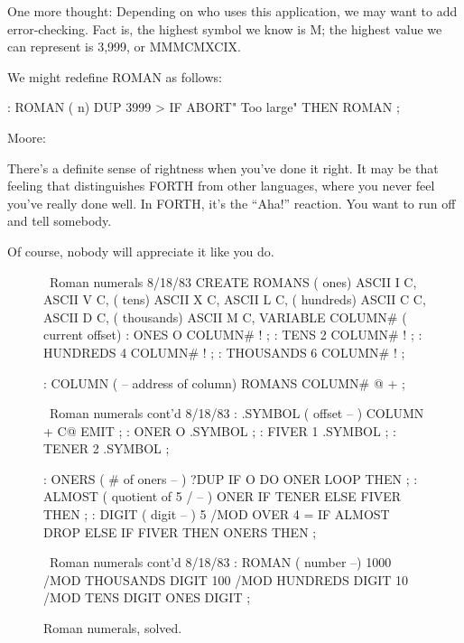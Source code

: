 One more thought: Depending on who uses this application, we may
want to add error-checking. Fact is, the highest symbol we know is M; the
highest value we can represent is 3,999, or MMMCMXCIX.

We might redefine ROMAN as follows:

\begin{Code}
: ROMAN  ( n)
   DUP  3999 > IF  ABORT" Too large"  THEN  ROMAN ;
\end{Code}

\blackline{2ex}
\noindent Moore:

\begin{tfquot}
There's a definite sense of rightness when you've done it right. It may be
that feeling that distinguishes FORTH from other languages, where you
never feel you've really done well. In FORTH, it's the ``Aha!'' reaction. You
want to run off and tell somebody.

Of course, nobody will appreciate it like you do.
\end{tfquot}
\blackline{1ex}

\begin{figure}[pppp]
\caption{Roman numerals, solved.}
\vspace{1ex}
\setcounter{screen}{20}
\begin{Screen}
\ Roman numerals                                      8/18/83
CREATE ROMANS    ( ones)  ASCII I  C,   ASCII V  C,
                 ( tens)  ASCII X  C,   ASCII L  C,
             ( hundreds)  ASCII C  C,   ASCII D  C,
            ( thousands)  ASCII M  C,
VARIABLE COLUMN#  ( current offset)
: ONES       O COLUMN# ! ;
: TENS       2 COLUMN# ! ;
: HUNDREDS   4 COLUMN# ! ;
: THOUSANDS  6 COLUMN# ! ;

: COLUMN ( -- address of column)  ROMANS  COLUMN# @  + ;

\end{Screen}

\begin{Screen}
\ Roman numerals cont'd                               8/18/83
: .SYMBOL  ( offset -- )  COLUMN +  C@ EMIT ;
: ONER    O .SYMBOL ;
: FIVER   1 .SYMBOL ;
: TENER   2 .SYMBOL ;

: ONERS  ( # of oners -- )
   ?DUP  IF  O DO  ONER  LOOP  THEN ;
: ALMOST  ( quotient of 5 / -- )
   ONER  IF  TENER  ELSE  FIVER  THEN ;
: DIGIT  ( digit -- )
   5 /MOD  OVER  4 = IF  ALMOST  DROP  ELSE  IF FIVER THEN
   ONERS THEN ;

\end{Screen}

\begin{Screen}
\ Roman numerals cont'd                             8/18/83
: ROMAN  ( number --)  1000 /MOD  THOUSANDS DIGIT
                        100 /MOD   HUNDREDS DIGIT
                         10 /MOD       TENS DIGIT
                                       ONES DIGIT  ;

\end{Screen}
\vspace{1ex}
\label{fig-fig4-9}
\end{figure}

